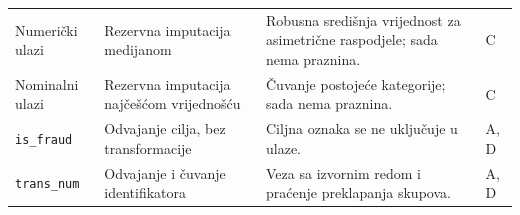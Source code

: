 \begin{longtable}{@{}>{\raggedright\arraybackslash}p{.21\linewidth}>{\raggedright\arraybackslash}p{.27\linewidth}>{\raggedright\arraybackslash}p{.33\linewidth}>{\raggedright\arraybackslash}p{.10\linewidth}@{}}
Numerički ulazi & Rezervna imputacija medijanom & Robusna središnja vrijednost za asimetrične raspodjele; sada nema praznina. & C \\
Nominalni ulazi & Rezervna imputacija najčešćom vrijednošću & Čuvanje postojeće kategorije; sada nema praznina. & C \\
\texttt{is\_fraud} & Odvajanje cilja, bez transformacije & Ciljna oznaka se ne uključuje u ulaze. & A, D \\
\texttt{trans\_num} & Odvajanje i čuvanje identifikatora & Veza sa izvornim redom i praćenje preklapanja skupova. & A, D \\
\end{longtable}\endgroup
